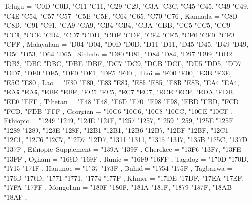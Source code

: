 {    Telugu                                         = { {"C0D} {"C0D}, {"C11} {"C11}, {"C29} {"C29}, {"C3A} {"C3C}, {"C45} {"C45}, {"C49} {"C49}, {"C4E} {"C54}, {"C57} {"C57}, {"C5B} {"C5F}, {"C64} {"C65}, {"C70} {"C76} },
    Kannada                                        = { {"C8D} {"C8D}, {"C91} {"C91}, {"CA9} {"CA9}, {"CB4} {"CB4}, {"CBA} {"CBB}, {"CC5} {"CC5}, {"CC9} {"CC9}, {"CCE} {"CD4}, {"CD7} {"CDD}, {"CDF} {"CDF}, {"CE4} {"CE5}, {"CF0} {"CF0}, {"CF3} {"CFF} },
    Malayalam                                      = { {"D04} {"D04}, {"D0D} {"D0D}, {"D11} {"D11}, {"D45} {"D45}, {"D49} {"D49}, {"D50} {"D53}, {"D64} {"D65} },
    Sinhala                                        = { {"D80} {"D81}, {"D84} {"D84}, {"D97} {"D99}, {"DB2} {"DB2}, {"DBC} {"DBC}, {"DBE} {"DBF}, {"DC7} {"DC9}, {"DCB} {"DCE}, {"DD5} {"DD5}, {"DD7} {"DD7}, {"DE0} {"DE5}, {"DF0} {"DF1}, {"DF5} {"E00} },
    Thai                                           = { {"E00} {"E00}, {"E3B} {"E3E}, {"E5C} {"E80} },
    Lao                                            = { {"E80} {"E80}, {"E83} {"E83}, {"E85} {"E85}, {"E8B} {"E8B}, {"EA4} {"EA4}, {"EA6} {"EA6}, {"EBE} {"EBF}, {"EC5} {"EC5}, {"EC7} {"EC7}, {"ECE} {"ECF}, {"EDA} {"EDB}, {"EE0} {"EFF} },
    Tibetan                                        = { {"F48} {"F48}, {"F6D} {"F70}, {"F98} {"F98}, {"FBD} {"FBD}, {"FCD} {"FCD}, {"FDB} {"FFF} },
    Georgian                                       = { {"10C6} {"10C6}, {"10C8} {"10CC}, {"10CE} {"10CF} },
    Ethiopic                                       = { {"1249} {"1249}, {"124E} {"124F}, {"1257} {"1257}, {"1259} {"1259}, {"125E} {"125F}, {"1289} {"1289}, {"128E} {"128F}, {"12B1} {"12B1}, {"12B6} {"12B7}, {"12BF} {"12BF}, {"12C1} {"12C1}, {"12C6} {"12C7}, {"12D7} {"12D7}, {"1311} {"1311}, {"1316} {"1317}, {"135B} {"135C}, {"137D} {"137F} },
    Ethiopic~Supplement                            = { {"139A} {"139F} },
    Cherokee                                       = { {"13F6} {"13F7}, {"13FE} {"13FF} },
    Ogham                                          = { {"169D} {"169F} },
    Runic                                          = { {"16F9} {"16FF} },
    Tagalog                                        = { {"170D} {"170D}, {"1715} {"171F} },
    Hanunoo                                        = { {"1737} {"173F} },
    Buhid                                          = { {"1754} {"175F} },
    Tagbanwa                                       = { {"176D} {"176D}, {"1771} {"1771}, {"1774} {"177F} },
    Khmer                                          = { {"17DE} {"17DF}, {"17EA} {"17EF}, {"17FA} {"17FF} },
    Mongolian                                      = { {"180F} {"180F}, {"181A} {"181F}, {"1879} {"187F}, {"18AB} {"18AF} },
}
